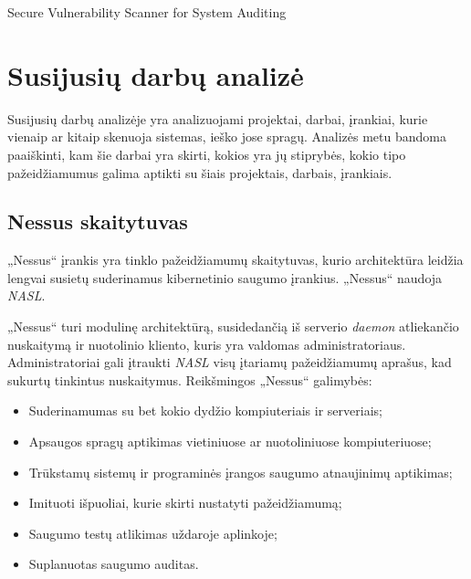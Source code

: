 \documentclass[a4paper,12pt,fleqn]{article}
\begin{document}
\bothabstracts{}%
{Secure Vulnerability Scanner for System Auditing} %
{}%






\newpage
\section{Susijusių darbų analizė}
\label{sec:motivation}

Susijusių darbų analizėje yra analizuojami projektai, darbai, įrankiai, kurie vienaip ar kitaip skenuoja sistemas, ieško jose spragų. Analizės metu bandoma paaiškinti, kam šie darbai yra skirti, kokios yra jų stiprybės, kokio tipo pažeidžiamumus galima aptikti su šiais projektais, darbais, įrankiais.

\subsection{Nessus skaitytuvas}
\label{sec:example}

„Nessus“ įrankis yra tinklo pažeidžiamumų skaitytuvas, kurio architektūra leidžia lengvai susietų suderinamus kibernetinio saugumo įrankius\cite{rogers2011nessus}. „Nessus“ naudoja \textit{NASL}. 

„Nessus“ turi modulinę architektūrą, susidedančią iš serverio \textit{daemon} atliekančio nuskaitymą ir nuotolinio kliento, kuris yra valdomas administratoriaus. Administratoriai gali įtraukti \textit{NASL} visų įtariamų pažeidžiamumų aprašus, kad sukurtų tinkintus nuskaitymus. Reikšmingos „Nessus“ galimybės:

\begin{itemize}
	\item Suderinamumas su bet kokio dydžio kompiuteriais ir serveriais;
	\item Apsaugos spragų aptikimas vietiniuose ar nuotoliniuose kompiuteriuose;
	\item Trūkstamų sistemų ir programinės įrangos saugumo atnaujinimų aptikimas;
	\item Imituoti išpuoliai, kurie skirti nustatyti pažeidžiamumą;
	\item Saugumo testų atlikimas uždaroje aplinkoje;
	\item Suplanuotas saugumo auditas.
\end{itemize}
\end{document}
